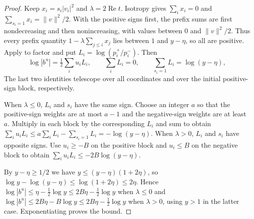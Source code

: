 \begin{proof}
Keep $x_i=s_i|v_i|^2$ and $\lambda=2\operatorname{Re}t$. Isotropy gives $\sum_i x_i=0$ and $\sum_{s_i=1}x_i=\|v\|^2/2$. With the positive signs first, the prefix sums are first nondecreasing and then nonincreasing, with values between $0$ and $\|v\|^2/2$. Thus every prefix quantity $1-\lambda\sum_{j\le i}x_j$ lies between $1$ and $y-\eta$, so all are positive. Apply  to factor and put $L_i=\log(p_i^+/p_i^-)$. Then
\[
 \log|b^u|=\tfrac12\sum_i u_iL_i,\qquad
 \sum_i L_i=0,\qquad
 \sum_{s_i=1}L_i=\log(y-\eta),
\]
The last two identities telescope over all coordinates and over the initial positive-sign block, respectively.

When $\lambda\le0$, $L_i$ and $s_i$ have the same sign. Choose an integer $a$ so that the positive-sign weights are at most $a-1$ and the negative-sign weights are at least $a$. Multiply in each block by the corresponding $L_i$ and sum to obtain $\sum_i u_iL_i\le a\sum_i L_i-\sum_{s_i=1}L_i=-\log(y-\eta)$. When $\lambda>0$, $L_i$ and $s_i$ have opposite signs. Use $u_i\ge-B$ on the positive block and $u_i\le B$ on the negative block to obtain $\sum_i u_iL_i\le-2B\log(y-\eta)$.

By $y-\eta\ge1/2$ we have $y\le(y-\eta)(1+2\eta)$, so $\log y-\log(y-\eta)\le\log(1+2\eta)\le2\eta$. Hence $\log|b^u|\le\eta-\frac12\log y\le2B\eta-\frac12\log y$ when $\lambda\le0$ and $\log|b^u|\le2B\eta-B\log y\le2B\eta-\frac12\log y$ when $\lambda>0$, using $y>1$ in the latter case. Exponentiating proves the bound.
\end{proof}

